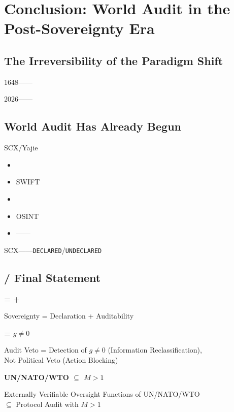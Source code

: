 \documentclass[12pt,a4paper]{article}
\theoremstyle{remark}
\newcommand{\UNDECLARED}{\texttt{UNDECLARED}}
\newcommand{\DECLARED}{\texttt{DECLARED}}
\begin{document}
\section{Conclusion: World Audit in the Post-Sovereignty Era}

\subsection{}
\subsection{The Irreversibility of the Paradigm Shift}

1648——\textbf{}

2026——\textbf{}

\subsection{}
\subsection{World Audit Has Already Begun}

SCX/Yajie

\begin{itemize}[nosep]
    \item 
    \item SWIFT
    \item 
    \item OSINT
    \item ——
\end{itemize}

SCX——\textbf{}\DECLARED/\UNDECLARED{}

\subsection{ / Final Statement}

\begin{keybox}[title=\textbf{ / The Core Formula of World Audit Governance}]
    \begin{center}
        \Large \textbf{ =  + }

        \normalsize Sovereignty = Declaration + Auditability

        \bigskip
        \Large \textbf{ = $g \neq 0$ \\}

        \normalsize Audit Veto = Detection of $g \neq 0$ (Information Reclassification), \\
        \normalsize Not Political Veto (Action Blocking)

        \bigskip
        \Large \textbf{UN/NATO/WTO $\subseteq$ $M > 1$ }

        \normalsize Externally Verifiable Oversight Functions of UN/NATO/WTO \\
        \normalsize $\subseteq$ Protocol Audit with $M > 1$
    \end{center}
\end{keybox}
\end{document}
